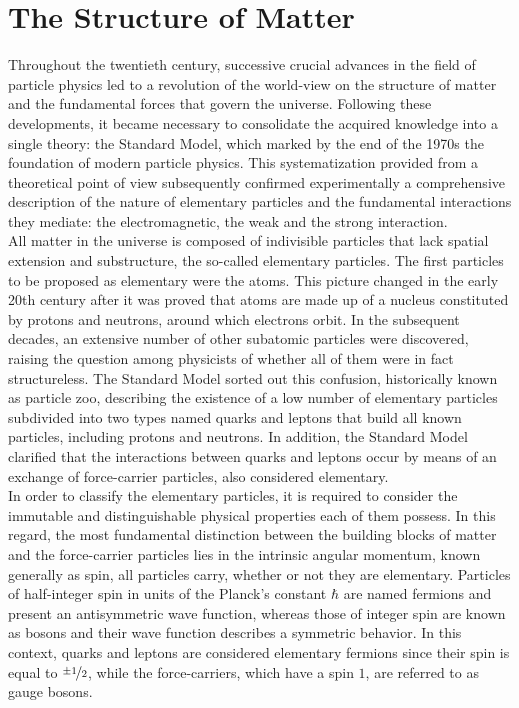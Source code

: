 \documentclass[12pt,a4paper]{report}
\begin{document}
\section{The Structure of Matter}
\label{sec:DasSMT}
Throughout the twentieth century, successive crucial advances in the field of particle physics led to a revolution of the world-view on the structure of matter and the fundamental forces that govern the universe. Following these developments, it became necessary to consolidate the acquired knowledge into a single theory: the Standard Model, which marked by the end of the 1970s the foundation of modern particle physics. This systematization provided from a theoretical point of view subsequently confirmed experimentally a comprehensive description of the nature of elementary particles and the fundamental interactions they mediate: the electromagnetic, the weak and the strong interaction. \\
All matter in the universe is composed of indivisible particles that lack spatial extension and substructure, the so-called elementary particles. The first particles to be proposed as elementary were the atoms. This picture changed in the early 20th century after it was proved that atoms are made up of a nucleus constituted by protons and neutrons, around which electrons orbit. In the subsequent decades, an extensive number of other subatomic particles were discovered, raising the question among physicists of whether all of them were in fact structureless. The Standard Model sorted out this confusion, historically known as particle zoo, describing the existence of a low number of elementary particles subdivided into two types named quarks and leptons that build all known particles, including protons and neutrons. In addition, the Standard Model clarified that the interactions between quarks and leptons occur by means of an exchange of force-carrier particles, also considered elementary. \\
In order to classify the elementary particles, it is required to consider the immutable and distinguishable physical properties each of them possess. In this regard, the most fundamental distinction between the building blocks of matter and the force-carrier particles lies in the intrinsic angular momentum, known generally as spin, all particles carry, whether or not they are elementary. Particles of half-integer spin in units of the Planck's constant $\hbar$ are named fermions and present an antisymmetric wave function, whereas those of integer spin are known as bosons and their wave function describes a symmetric behavior. In this context, quarks and leptons are considered elementary fermions since their spin is equal to $\nicefrac{\pm 1}{2}$, while the force-carriers, which have a spin $1$, are referred to as gauge bosons.\\
\end{document}
